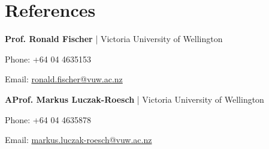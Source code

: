 \documentclass[11pt]{article} %
\begin{document}
\section*{References}
\textbf{Prof. Ronald Fischer} | Victoria University of Wellington

Phone: +64 04 4635153 

Email: \href{mailto:ronald.fischer@vuw.ac.nz}{ronald.fischer@vuw.ac.nz}


\textbf{AProf.  Markus Luczak-Roesch} | Victoria University of Wellington

Phone: +64 04 4635878 

Email: \href{mailto:markus.luczak-roesch@vuw.ac.nz}{markus.luczak-roesch@vuw.ac.nz}


\vfill %


\end{document}
